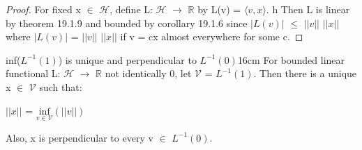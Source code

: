    \begin{proof}
        For fixed x $\in$ $\mathcal{H}$, define
        L: $\mathcal{H}$ $\rightarrow$ $\mathbb{R}$
        by L(v) = $\langle v , x \rangle$.
        h
        Then L is linear by {\color{red} theorem 19.1.9}
        and bounded by {\color{orange} corollary 19.1.6}
        since $|L(v)|$ $\leq$ $||v||$ $||x||$
        where $|L(v)|$ = $||v||$ $||x||$ if v = cx almost everywhere for some c.
    \end{proof}

    \newpage



    \begin{wtheorem}{inf($L^{-1}(1)$) is unique
    and perpendicular to $L^{-1}(0)$}{16cm}
        For bounded linear functional L: $\mathcal{H}$ $\rightarrow$ $\mathbb{R}$
        not identically 0, let $\mathcal{V}$ = $L^{-1}(1)$.
        Then there is a unique x $\in$ $\mathcal{V}$ such that:

        \hspace{0.5cm}
        $||x||$ = $\underset{v \in \mathcal{V}}{\text{inf}} (||v||)$

        Also, x is perpendicular to every v $\in$ $L^{-1}(0)$.
    \end{wtheorem}

